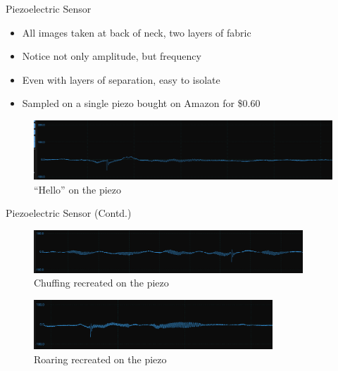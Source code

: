 \begin{frame}{Piezoelectric Sensor}
    \begin{itemize}
        \item All images taken at back of neck, two layers of fabric
        \item Notice not only amplitude, but frequency
        \item Even with layers of separation, easy to isolate
        \item Sampled on a single piezo bought on Amazon for \$0.60
    \end{itemize}
    \hspace{10pt}
    \begin{figure}
        \centering
        \includegraphics[height=0.8\textheight,width=1\textwidth,keepaspectratio]{images/piezo_hello_muffled.png}
        \caption{``Hello'' on the piezo}
    \end{figure}
\end{frame}

\begin{frame}{Piezoelectric Sensor (Contd.)}
    \begin{figure}
        \centering
        \includegraphics[height=0.5\textheight,width=0.9\textwidth,keepaspectratio]{images/piezo_chuffing_muffled.png}
        \caption{Chuffing recreated on the piezo}
    \end{figure}
    \begin{figure}
        \centering
        \includegraphics[height=0.5\textheight,width=0.8\textwidth,keepaspectratio]{images/piezo_roar_muffled.png}
        \caption{Roaring recreated on the piezo}
    \end{figure}
\end{frame}

